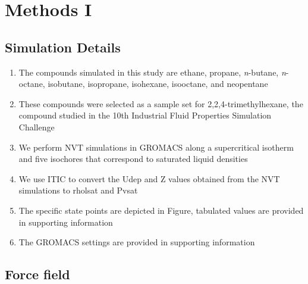 \documentclass[preprint,letterpaper,floatfix,citeautoscript,aip,jcp]{revtex4-1}
\begin{document}
\section{Methods I}

\subsection{Simulation Details}

\begin{enumerate}
	\item The compounds simulated in this study are ethane, propane, \textit{n}-butane, \textit{n}-octane, isobutane, isopropane, isohexane, isooctane, and neopentane
	\item These compounds were selected as a sample set for 2,2,4-trimethylhexane, the compound studied in the 10th Industrial Fluid Properties Simulation Challenge
	\item We perform NVT simulations in GROMACS along a supercritical isotherm and five isochores that correspond to saturated liquid densities
	\item We use ITIC to convert the Udep and Z values obtained from the NVT simulations to rholsat and Pvsat
	\item The specific state points are depicted in Figure, tabulated values are provided in supporting information
	\item The GROMACS settings are provided in supporting information
\end{enumerate}

\subsection{Force field}
\end{document}
